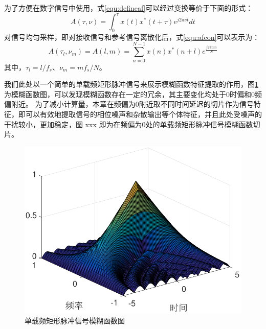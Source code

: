 为了方便在数字信号中使用，式\ref{equ:defineaf}可以经过变换等价于下面的形式：
\begin{equation}
A(\tau,\nu) = \int_{0}^{\tau}x(t)x^{*}(t+\tau)e^{j2\pi\nu t}dt
\label{equ:afcon}
\end{equation}
对信号均匀采样，即对接收信号和参考信号离散化后，式\ref{equ:afcon}可以表示为：
\begin{equation}
A(\tau_l,\nu_m) = A(l, m) = \sum_{n = 0}^{N-1}x(n)x^{*}(n+l)e^{\frac{j2\pi m n}{N}}	
\end{equation}
其中，$\tau_l=l/f_s$、$\nu_m=mf_s/N$。

我们此处以一个简单的单载频矩形脉冲信号来展示模糊函数特征提取的作用，图\ref{fig:danpinmaichong}为模糊函数图，可以发现模糊函数存在一定的冗余，其主要变化均处于0时偏和0频偏附近。
为了减小计算量，本章在频偏为0附近取不同时间延迟的切片作为信号特征，即可以有效地提取信号的相位噪声和杂散输出等个体特征，并且此处受噪声的干扰较小，更加稳定，图 xxx 即为在频偏为0处的单载频矩形脉冲信号模糊函数切片。

\begin{figure}
	\centering
	\includegraphics[width=\textwidth]{figures/emitter/danpinmaichong}
	\caption{单载频矩形脉冲信号模糊函数图}
	\label{fig:danpinmaichong}
\end{figure}

